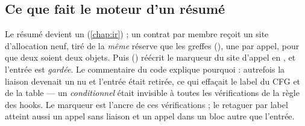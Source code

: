 \subsection{Ce que fait le moteur d'un résumé}


Le résumé devient un  (\cref{chap:ir}) ; un contrat par membre reçoit un site d'allocation neuf, tiré de la \emph{même} réserve que les greffes (), une par appel, pour que deux  soient deux objets. Puis  () réécrit le marqueur du site d'appel en , et l'entrée  est \emph{gardée}. Le commentaire du code explique pourquoi : autrefois la liaison devenait un  nu et l'entrée était retirée, ce qui effaçait le label du CFG et de la table --- un  \emph{conditionnel} était invisible à toutes les vérifications de la règle des hooks. Le marqueur est l'ancre de ces vérifications ; le retaguer par label atteint aussi un appel sans liaison et un appel dans un bloc autre que l'entrée.

